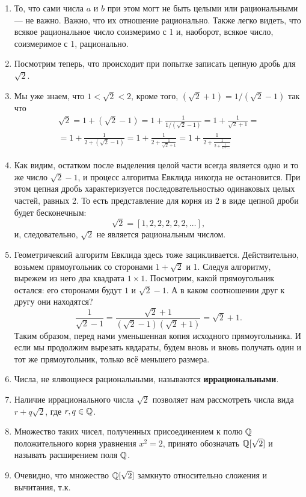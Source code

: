 \begin{enumerate}
\item То, что сами числа $a$ и $b$ при этом могт не быть целыми или рациональными --- не важно. Важно, что их отношение рационально. Также легко видеть, что всякое рациональное число соизмеримо с 1 и, наоборот, всякое число, соизмеримое с 1, рационально.
\item Посмотрим теперь, что происходит при попытке записать цепную дробь для $\sqrt 2$.
\item Мы уже знаем, что $1<\sqrt 2<2$, кроме того, $(\sqrt 2+1)=1/(\sqrt 2-1)$ так что
\begin{multline*}
\sqrt 2 = \boxed{1} + (\sqrt 2-1) = \boxed{1} + \frac{1}{1/(\sqrt 2-1)} = 
\boxed{1} + \frac{1}{\sqrt 2+1} = \\ 
= \boxed{1} + \frac{1}{\boxed{2} + (\sqrt 2-1)} = 
\boxed{1} + \frac{1}{\boxed{2} + \frac{1}{\sqrt 2+1}} = 
\boxed{1} + \frac{1}{\boxed{2} + \frac{1}{\boxed{2} + \frac{1}{\boxed{2} + \dots}}}
\end{multline*}
\item Как видим, остатком после выделения целой части всегда является одно и то же число $\sqrt 2-1$, и процесс алгоритма Евклида никогда не остановится. При этом цепная дробь характеризуется последовательностью одинаковых целых частей, равных 2. То есть представление для корня из 2 в виде цепной дроби будет бесконечным:
$$
\sqrt 2 = [1,2,2,2,2,2,\dots],
$$
и, следовательно, $\sqrt 2$ не является рациональным числом.
\item Геометричексий алгоритм Евклида здесь тоже зацикливается. Действительно, возьмем прямоугольник со сторонами $1+\sqrt 2$ и 1. Следуя алгоритму, вырежем из него два квадрата $1\times 1$. Посмотрим, какой прямоугольник остался: его сторонами будут $1$ и $\sqrt 2-1$. А в каком соотношении друг к другу они находятся?
$$
\frac{1}{\sqrt 2-1}=\frac{\sqrt{2}+1}{(\sqrt 2-1)(\sqrt 2+1)}=\sqrt 2+1.
$$
Таким образом, перед нами уменьшенная копия исходного прямоугольника. И если мы продолжим вырезать квдараты, будем вновь и вновь получать один и тот же прямоугольник, только всё меньшего размера.
\item Числа, не яляющиеся рациональными, называются \textbf{иррациональными}.
\item Наличие иррационального числа $\sqrt 2$ позволяет нам рассмотреть числа вида $r+q\sqrt 2$, где $r,q\in\mathbb Q$.
\item Множество таких чисел, полученных присоединением к полю $\mathbb Q$ положительного корня уравнения $x^2=2$, принято обозначать $\mathbb Q[\sqrt 2]$ и называть расширением поля $\mathbb Q$.
\item Очевидно, что множество $\mathbb Q[\sqrt 2]$ замкнуто относительно сложения и вычитания, т.к.

\end{enumerate}
